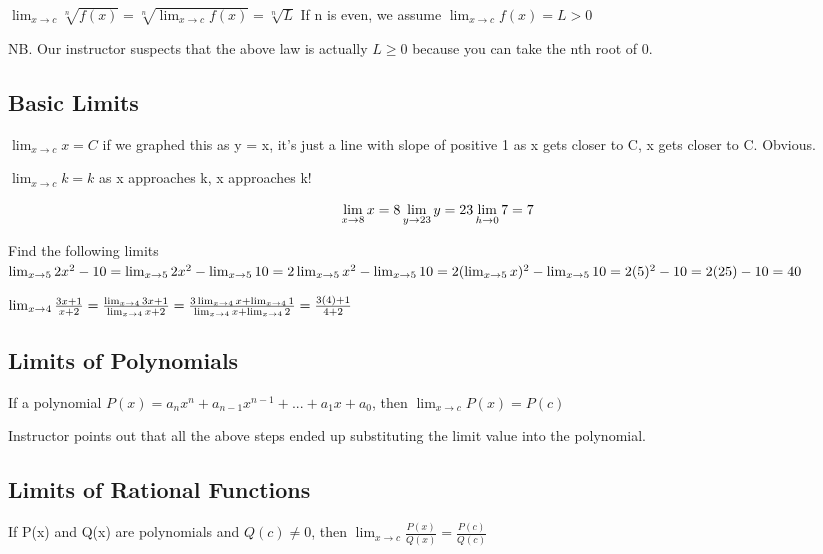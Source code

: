 \documentclass[12pt]{article}
\begin{document}
$\lim_{x \to c}\sqrt[n]{f(x)} = \sqrt[n]{\lim_{x\to c}f(x)} = \sqrt[n]{L}$
If n is even, we assume $\lim_{x \to c}f(x) = L > 0$

NB. Our instructor suspects that the above law is actually $L \geq 0$ because you can take the nth root of 0.

\subsection{Basic Limits}

$\lim_{x \to c}x = C$
if we graphed this as y = x, it's just a line with slope of positive 1
as x gets closer to C, x gets closer to C. Obvious.

$\lim_{x \to c}k = k$ as x approaches k, x approaches k!

$$
\lim_{x \to 8} x = 8\\
\lim_{y \to 23} y = 23\\
\lim_{h \to 0} 7 = 7
$$

Find the following limits
$\lim_{x \to 5}2x^2 - 10\\
=\lim_{x \to 5}2x^2 - \lim_{x \to 5}10\\
=2\lim_{x \to 5}x^2 - \lim_{x \to 5}10\\
=2(\lim_{x \to 5}x)^2 - \lim_{x \to 5}10\\
=2(5)^2 - 10\\
=2(25) - 10\\
= 40$

$\lim_{x \to 4}\frac{3x+1}{x+2}\\
=\frac{\lim_{x \to 4}3x+1}{\lim_{x \to 4}x+2}\\
=\frac{3\lim_{x \to 4}x+\lim_{x \to 4}1}{\lim_{x \to 4}x+\lim_{x \to 4}2}\\
=\frac{3(4)+1}{4+2}
$

\subsection{Limits of Polynomials}
If a polynomial $P(x) = a_n x^n + a_{n-1}x^{n-1}+ ... + a_1x + a_0$, then $\lim_{x \to c} P(x)= P(c)$

Instructor points out that all the above steps ended up substituting the limit value into the polynomial.

\subsection{Limits of Rational Functions}
If P(x) and Q(x) are polynomials and $Q(c) \neq 0$, then $\lim_{x \to c}\frac{P(x)}{Q(x)} = \frac{P(c)}{Q(c)}$
\end{document}
